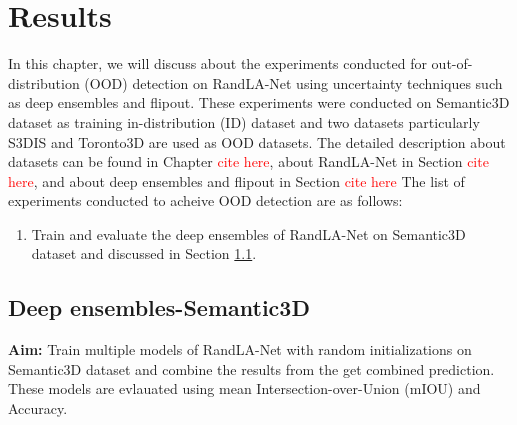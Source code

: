 

    \chapter{Results}
    In this chapter, we will discuss about the experiments conducted for out-of-distribution (OOD) detection on RandLA-Net using uncertainty techniques such as deep ensembles and flipout.
    These experiments were conducted on Semantic3D dataset as training in-distribution (ID) dataset and two datasets particularly S3DIS and Toronto3D are used as OOD datasets. 
    The detailed description about datasets can be found in Chapter \textcolor{red}{cite here}, about RandLA-Net in Section \textcolor{red}{cite here}, and about deep ensembles and flipout in Section \textcolor{red}{cite here}
    The list of experiments conducted to acheive OOD detection are as follows:
    \begin{enumerate}
        \item Train and evaluate the deep ensembles of RandLA-Net on Semantic3D dataset and discussed in Section \ref{sec:deepensemble_train}.
    \end{enumerate}

    \section{Deep ensembles-Semantic3D}
    \label{sec:deepensemble_train}
    \textbf{Aim:} Train multiple models of RandLA-Net with random initializations on Semantic3D dataset and combine the results from the get combined prediction. 
    These models are evlauated using mean Intersection-over-Union (mIOU) and Accuracy.

